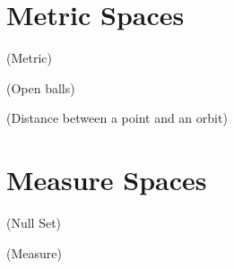 \documentclass[11pt]{article}
\begin{document}
\section{Metric Spaces}
\begin{definition}
  (Metric)
\end{definition}
\begin{definition}
  (Open balls)
\end{definition}
\begin{definition}
  (Distance between a point and an orbit)
\end{definition}

\section{Measure Spaces}
\begin{definition}
  (Null Set)
\end{definition}
\begin{definition}
  (Measure)
\end{definition}
\end{document}
